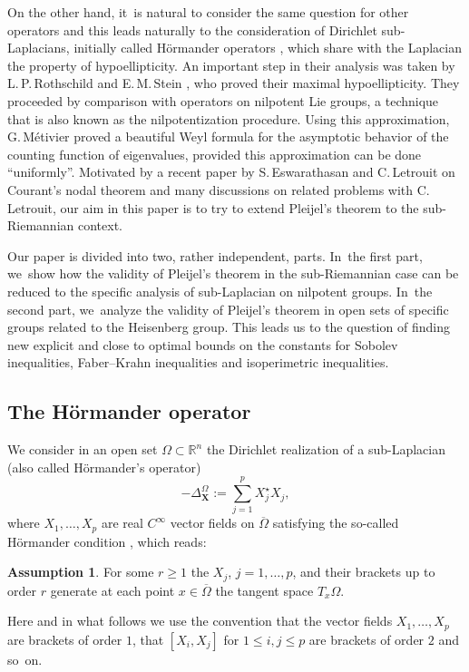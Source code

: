 \documentclass[10pt]{amsart}
\newcommand{\bX}{{\boldsymbol{X}}}
\theoremstyle{definition}
\newtheorem{assumption}[theorem]{Assumption}
\newcommand{\1}{\mathbbm{1}}
\begin{document}
On the other hand, it~is natural to consider the same question for other operators and this leads naturally to the consideration of Dirichlet sub-Laplacians, initially called Hörmander operators \cite{Ho}, which share with the Laplacian the property of hypoellipticity. An important step in
their analysis was taken by L.\,P.\,Rothschild and E.\,M.\,Stein \cite{RS}, who proved their maximal hypoellipticity. They proceeded by comparison with operators on nilpotent Lie groups, a technique that is also known as the nilpotentization procedure. Using this approximation, G.\,Métivier \cite{Me} proved a beautiful Weyl formula for the asymptotic behavior of the counting function of eigenvalues, provided this approximation can be done ``uniformly''. Motivated by a recent paper \cite{EL} by S.\,Eswarathasan and C.\,Letrouit on Courant's nodal theorem and many discussions on related problems with C.\,Letrouit, our aim in this paper is to try to extend Pleijel's theorem to the sub-Riemannian context.

Our paper is divided into two, rather independent, parts. In~the first part, we~show how the validity of Pleijel's theorem in the sub-Riemannian case can be reduced to the specific analysis of sub-Laplacian on nilpotent groups. In~the second part, we~analyze the validity of Pleijel's theorem in open sets of specific groups related to the Heisenberg group. This leads us to the question of finding new explicit and close to optimal bounds on the constants for Sobolev inequalities, Faber--Krahn inequalities and isoperimetric inequalities.

\subsection{The Hörmander operator}
We consider in an open set $\Omega \subset \mathbb R^n$ the Dirichlet realization of a sub-Laplacian (also called Hörmander's operator)
\[
-\Delta_\bX^\Omega :=\sum_{j=1}^p X_j^\star X_j,
\]
where $X_1,\ldots,X_p$ are real $C^\infty$ vector fields on $\overline\Omega$ satisfying the so-called Hörmander condition \cite{Ho}, which reads:

\begin{assumption}\label{CHOr}
For some $r\geq 1$ the $X_j$, $j=1,\ldots,p$, and their brackets up to order $r$ generate at each point $ x\in \overline{\Omega}$ the tangent space $T_x \Omega$.
\end{assumption}

Here and in what follows we use the convention that the vector fields $X_1,\ldots,X_p$ are brackets of order $1$, that $[X_i,X_j]$ for $1\leq i,j\leq p$ are brackets of order $2$ and so~on.
\end{document}
